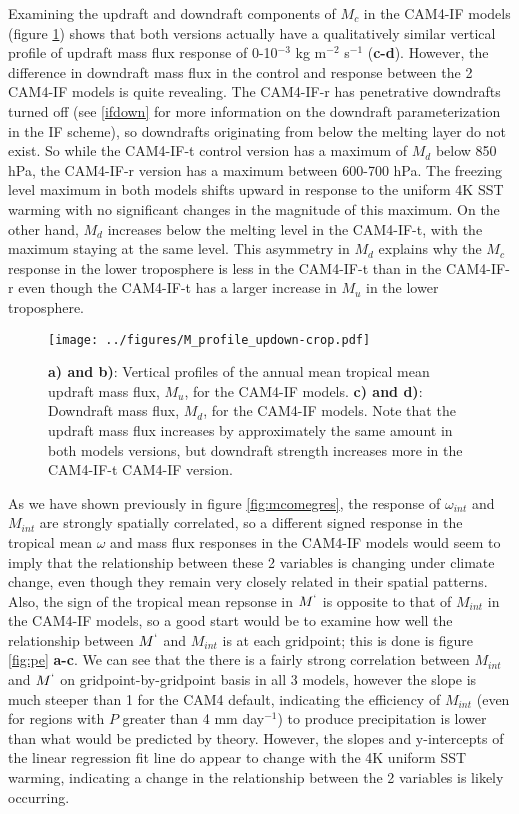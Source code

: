\documentclass[letterpaper,12pt,titlepage,oneside,final]{book}
\begin{document}
Examining the updraft and downdraft components of $M_{c}$ in the CAM4-IF models (figure \ref{fig:updown}) shows that both versions actually have a qualitatively similar vertical profile of updraft mass flux response of 0-10$^{-3}$ kg m$^{-2}$ s$^{-1}$ (\textbf{c-d}). However, the difference in downdraft mass flux in the control and response between the 2 CAM4-IF models is quite revealing. The CAM4-IF-r has penetrative downdrafts turned off (see \ref{ifdown} for more information on the downdraft parameterization in the IF scheme), so downdrafts originating from below the melting layer do not exist. So while the CAM4-IF-t control version has a maximum of $M_{d}$ below 850 hPa, the CAM4-IF-r version has a maximum between 600-700 hPa. The freezing level maximum in both models shifts upward in response to the uniform 4K SST warming with no significant changes in the magnitude of this maximum. On the other hand, $M_{d}$ increases below the melting level in the CAM4-IF-t, with the maximum staying at the same level. This asymmetry in $M_{d}$ explains why the $M_{c}$ response in the lower troposphere is less in the CAM4-IF-t than in the CAM4-IF-r even though the CAM4-IF-t has a larger increase in $M_{u}$ in the lower troposphere. 
\begin{figure}[H]
\centering
\noindent\texttt{[image: ../figures/M\_profile\_updown-crop.pdf]}\hfill
\caption{ \textbf{a) and b)}: Vertical profiles of the annual mean tropical mean updraft mass flux, $M_{u}$, for the CAM4-IF models. \textbf{c) and d)}: Downdraft mass flux, $M_{d}$, for the CAM4-IF models. Note that the updraft mass flux increases by approximately the same amount in both models versions, but downdraft strength increases more in the CAM4-IF-t CAM4-IF version.}
\label{fig:updown}
\end{figure}
As we have shown previously in figure \ref{fig:mcomegres}, the response of $\omega_{int}$ and $M_{int}$ are strongly spatially correlated, so a different signed response in the tropical mean $\omega$ and mass flux responses in the CAM4-IF models would seem to imply that the relationship between these 2 variables is changing under climate change, even though they remain very closely related in their spatial patterns. Also, the sign of the tropical mean repsonse in $M^{`}$ is opposite to that of $M_{int}$ in the CAM4-IF models, so a good start would be to examine how well the relationship between $M^{`}$ and $M_{int}$ is at each gridpoint; this is done is figure \ref{fig:pe} \textbf{a-c}. We can see that the there is a fairly strong correlation between $M_{int}$ and $M^{`}$  on gridpoint-by-gridpoint basis in all 3 models, however the slope is much steeper than 1 for the CAM4 default, indicating the efficiency of $M_{int}$ (even for regions with $P$ greater than 4 mm day$^{-1}$) to produce precipitation is lower than what would be predicted by theory. However, the slopes and y-intercepts of the linear regression fit line do appear to change with the 4K uniform SST warming, indicating a change in the relationship between the 2 variables is likely occurring. 
\end{document}
